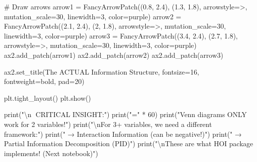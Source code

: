 \documentclass[
  11pt,
  letterpaper,
  oneside,
  openany]{book}
\newenvironment{Shaded}{\begin{snugshade}}{\end{snugshade}}
\newcommand{\BuiltInTok}[1]{\textcolor[rgb]{0.00,0.23,0.31}{#1}}
\newcommand{\CharTok}[1]{\textcolor[rgb]{0.13,0.47,0.30}{#1}}
\newcommand{\CommentTok}[1]{\textcolor[rgb]{0.37,0.37,0.37}{#1}}
\newcommand{\DecValTok}[1]{\textcolor[rgb]{0.68,0.00,0.00}{#1}}
\newcommand{\FloatTok}[1]{\textcolor[rgb]{0.68,0.00,0.00}{#1}}
\newcommand{\NormalTok}[1]{\textcolor[rgb]{0.00,0.23,0.31}{#1}}
\newcommand{\OperatorTok}[1]{\textcolor[rgb]{0.37,0.37,0.37}{#1}}
\newcommand{\StringTok}[1]{\textcolor[rgb]{0.13,0.47,0.30}{#1}}
\begin{document}
\begin{Shaded}
\begin{Highlighting}[]
\CommentTok{\# Draw arrows}
\NormalTok{arrow1 }\OperatorTok{=}\NormalTok{ FancyArrowPatch((}\FloatTok{0.8}\NormalTok{, }\FloatTok{2.4}\NormalTok{), (}\FloatTok{1.3}\NormalTok{, }\FloatTok{1.8}\NormalTok{), }
\NormalTok{                         arrowstyle}\OperatorTok{=}\StringTok{\textquotesingle{}{-}\textgreater{}\textquotesingle{}}\NormalTok{, mutation\_scale}\OperatorTok{=}\DecValTok{30}\NormalTok{, linewidth}\OperatorTok{=}\DecValTok{3}\NormalTok{, color}\OperatorTok{=}\StringTok{\textquotesingle{}purple\textquotesingle{}}\NormalTok{)}
\NormalTok{arrow2 }\OperatorTok{=}\NormalTok{ FancyArrowPatch((}\FloatTok{2.1}\NormalTok{, }\FloatTok{2.4}\NormalTok{), (}\DecValTok{2}\NormalTok{, }\FloatTok{1.8}\NormalTok{),}
\NormalTok{                         arrowstyle}\OperatorTok{=}\StringTok{\textquotesingle{}{-}\textgreater{}\textquotesingle{}}\NormalTok{, mutation\_scale}\OperatorTok{=}\DecValTok{30}\NormalTok{, linewidth}\OperatorTok{=}\DecValTok{3}\NormalTok{, color}\OperatorTok{=}\StringTok{\textquotesingle{}purple\textquotesingle{}}\NormalTok{)}
\NormalTok{arrow3 }\OperatorTok{=}\NormalTok{ FancyArrowPatch((}\FloatTok{3.4}\NormalTok{, }\FloatTok{2.4}\NormalTok{), (}\FloatTok{2.7}\NormalTok{, }\FloatTok{1.8}\NormalTok{),}
\NormalTok{                         arrowstyle}\OperatorTok{=}\StringTok{\textquotesingle{}{-}\textgreater{}\textquotesingle{}}\NormalTok{, mutation\_scale}\OperatorTok{=}\DecValTok{30}\NormalTok{, linewidth}\OperatorTok{=}\DecValTok{3}\NormalTok{, color}\OperatorTok{=}\StringTok{\textquotesingle{}purple\textquotesingle{}}\NormalTok{)}
\NormalTok{ax2.add\_patch(arrow1)}
\NormalTok{ax2.add\_patch(arrow2)}
\NormalTok{ax2.add\_patch(arrow3)}

\NormalTok{ax2.set\_title(}\StringTok{\textquotesingle{}The ACTUAL Information Structure\textquotesingle{}}\NormalTok{, fontsize}\OperatorTok{=}\DecValTok{16}\NormalTok{, fontweight}\OperatorTok{=}\StringTok{\textquotesingle{}bold\textquotesingle{}}\NormalTok{, pad}\OperatorTok{=}\DecValTok{20}\NormalTok{)}

\NormalTok{plt.tight\_layout()}
\NormalTok{plt.show()}

\BuiltInTok{print}\NormalTok{(}\StringTok{"}\CharTok{\textbackslash{}n}\StringTok{🚨 CRITICAL INSIGHT:"}\NormalTok{)}
\BuiltInTok{print}\NormalTok{(}\StringTok{"="} \OperatorTok{*} \DecValTok{60}\NormalTok{)}
\BuiltInTok{print}\NormalTok{(}\StringTok{"Venn diagrams ONLY work for 2 variables!"}\NormalTok{)}
\BuiltInTok{print}\NormalTok{(}\StringTok{"}\CharTok{\textbackslash{}n}\StringTok{For 3+ variables, we need a different framework:"}\NormalTok{)}
\BuiltInTok{print}\NormalTok{(}\StringTok{"  → Interaction Information (can be negative!)"}\NormalTok{)}
\BuiltInTok{print}\NormalTok{(}\StringTok{"  → Partial Information Decomposition (PID)"}\NormalTok{)}
\BuiltInTok{print}\NormalTok{(}\StringTok{"}\CharTok{\textbackslash{}n}\StringTok{These are what HOI package implements! (Next notebook)"}\NormalTok{)}
\end{Highlighting}
\end{Shaded}
\end{document}

